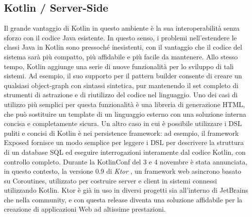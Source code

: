 \subsection{Kotlin / Server-Side}
Il grande vantaggio di Kotlin in questo ambiente è la sua interoperabilità senza sforzo con il codice Java esistente. In questo senso, i problemi nell’estendere le classi Java in Kotlin sono pressoché inesistenti, con il vantaggio che il codice del sistema sarà più compatto, più affidabile e più facile da mantenere. Allo stesso tempo, Kotlin aggiunge una serie di nuove funzionalità per lo sviluppo di tali sistemi. Ad esempio, il suo supporto per il pattern builder consente di creare un qualsiasi object-graph con sintassi sintetica, pur mantenendo il set completo di strumenti di astrazione e di riutilizzo del codice nel linguaggio. Uno dei casi di utilizzo più semplici per questa funzionalità è una libreria di generazione HTML, che può sostituire un template di un linguaggio esterno con una soluzione interna concisa e completamente sicura. Un altro caso in cui è possibile utilizzare i DSL puliti e concisi di Kotlin è nei persistence framework: ad esempio, il framework Exposed fornisce un modo semplice per leggere i DSL per descrivere la struttura di un database SQL ed eseguire interrogazioni interamente dal codice Kotlin, con controllo completo. Durante la KotlinConf del 3 e 4 novembre è stata annunciata, in questo contesto, la versione 0.9 di {\em Ktor} \cite{ktor}, un framework web asincrono basato su Coroutines, utilizzato per costruire server e client in sistemi connessi utilizzando Kotlin. Ktor è già in uso in diversi progetti sia all'interno di JetBrains che nella community, e con questa release diventa una soluzione affidabile per la creazione di applicazioni Web ad altissime prestazioni.\\

